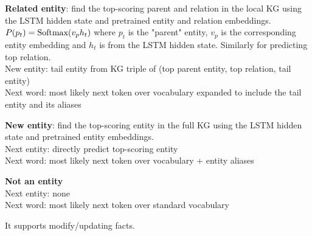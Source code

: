\documentclass[10pt]{report}
\begin{document}
\begin{list}{}{}
	\item \textbf{Related entity}: find the top-scoring parent and relation in the local KG using the LSTM hidden state and pretrained entity and relation embeddings.\\
	$P(p_t)=\hbox{Softmax}(v_ph_t)$ where $p_t$ is the "parent" entity, $v_p$ is the corresponding entity embedding and $h_t$ is from the LSTM hidden state. Similarly for predicting top relation.\\
	New entity: tail entity from KG triple of (top parent entity, top relation, tail entity)\\
	Next word: most likely next token over vocabulary expanded to include the tail entity and its aliases
	\item \textbf{New entity}: find the top-scoring entity in the full KG using the LSTM hidden state and pretrained entity embeddings.\\
	Next entity: directly predict top-scoring entity\\
	Next word: most likely next token over vocabulary + entity aliases
	\item \textbf{Not an entity}\\
	Next entity: none\\
	Next word: most likely next token over standard vocabulary
\end{list}
It supports modify/updating facts.
\end{document}
